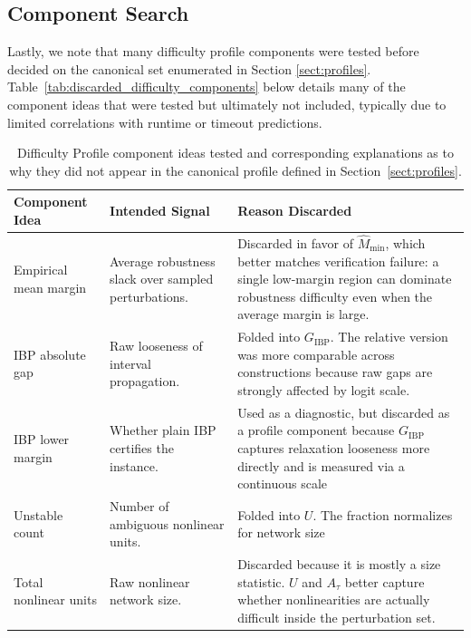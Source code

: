 \documentclass{article}
\theoremstyle{definition}
\begin{document}
\subsection{Component Search}\label{app:search}
Lastly, we note that many difficulty profile components were tested before decided on the canonical set enumerated in Section \ref{sect:profiles}. Table~\ref{tab:discarded_difficulty_components} below details many of the component ideas that were tested but ultimately not included, typically due to limited correlations with runtime or timeout predictions.

\begin{table}[h]
\caption{Difficulty Profile component ideas tested and corresponding explanations as to why they did not appear in the canonical profile defined in Section~\ref{sect:profiles}.}
\centering
\scriptsize
\setlength{\tabcolsep}{4pt}
\renewcommand{\arraystretch}{1.15}
\begin{tabularx}{\textwidth}{
@{}
>{\raggedright\arraybackslash}p{}
>{\raggedright\arraybackslash}p{}
>{\raggedright\arraybackslash}X
@{}}
\hline
\textbf{Component Idea} & \textbf{Intended Signal} & \textbf{Reason Discarded}\\
\hline\hline

Empirical mean margin
& Average robustness slack over sampled perturbations.
& Discarded in favor of $\widehat M_{\min}$, which better matches verification failure: a single low-margin region can dominate robustness difficulty even when the average margin is large. \\
\hline

IBP absolute gap
& Raw looseness of interval propagation.
& Folded into $G_{\mathrm{IBP}}$. The relative version was more comparable across constructions because raw gaps are strongly affected by logit scale. \\
\hline

IBP lower margin
& Whether plain IBP certifies the instance.
& Used as a diagnostic, but discarded as a profile component because $G_{\mathrm{IBP}}$ captures relaxation looseness more directly and is measured via a continuous scale \\
\hline

Unstable count
& Number of ambiguous nonlinear units.
& Folded into $U$. The fraction normalizes for network size \\
\hline

Total nonlinear units
& Raw nonlinear network size.
& Discarded because it is mostly a size statistic. $U$ and $A_\tau$ better capture whether nonlinearities are actually difficult inside the perturbation set. \\
\hline


\end{tabularx}
\end{table}
\end{document}
